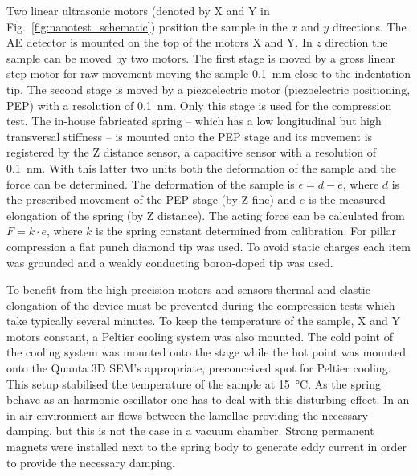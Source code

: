 Two linear ultrasonic motors (denoted by X and Y in Fig.~\ref{fig:nanotest_schematic}) position the sample in the $x$ and $y$ directions. The AE detector is mounted on the top of the motors X and Y. In $z$ direction the sample can be moved by two motors. The first stage is moved by a gross linear step motor for raw movement moving the sample \SI{0.1}{mm} close to the indentation tip. The second stage is moved by a piezoelectric motor (piezoelectric positioning, PEP) with a resolution of \SI{0.1}{nm}. Only this stage is used for the compression test. The in-house fabricated spring -- which has a low longitudinal but high transversal stiffness -- is mounted onto the PEP stage and its movement is registered by the Z distance sensor, a capacitive sensor with a resolution of \SI{0.1}{nm}. With this latter two units both the deformation of the sample and the force can be determined. The deformation of the sample is $\epsilon = d-e$, where $d$ is the prescribed movement of the PEP stage (by Z fine) and $e$ is the measured elongation of the spring (by Z distance). The acting force can be calculated from $F=k \cdot e$, where $k$ is the spring constant determined from calibration. For pillar compression a flat punch diamond tip was used. To avoid static charges each item was grounded and a weakly conducting boron-doped tip was used.

To benefit from the high precision motors and sensors thermal and elastic elongation of the device must be prevented during the compression tests which take typically several minutes. To keep the temperature of the sample, X and Y motors constant, a Peltier cooling system was also mounted. The cold point of the cooling system was mounted onto the stage while the hot point was mounted onto the Quanta 3D SEM's appropriate, preconceived spot for Peltier cooling. This setup stabilised the temperature of the sample at \SI{15}{\celsius}. As the spring behave as an harmonic oscillator one has to deal with this disturbing effect. In an in-air environment air flows between the lamellae providing the necessary damping, but this is not the case in a vacuum chamber. Strong permanent magnets were installed next to the spring body to generate eddy current in order to provide the necessary damping.



